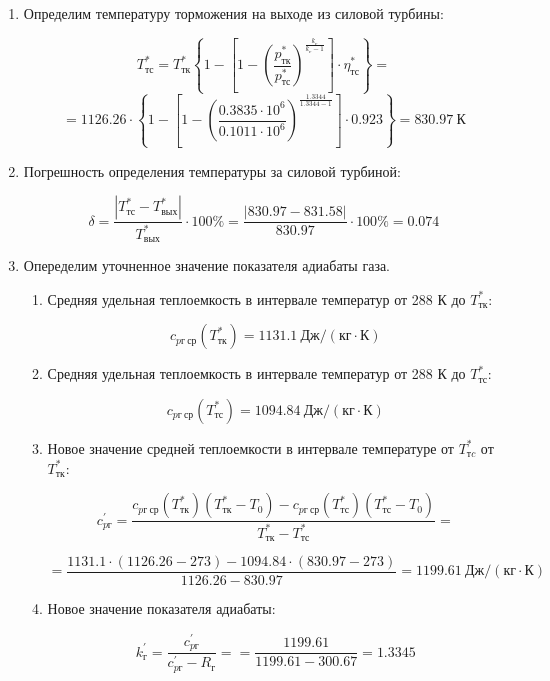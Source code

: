 \documentclass[a4paper,10pt]{article}
\begin{document}
\begin{enumerate}
	\item Определим температуру торможения на выходе из силовой турбины:
	
	\[
	T_{тс}^* = T_{тк}^* 
		\left\lbrace 
			1 - 
			\left[ 
				1 - 
					\left(
						\frac{ p_{тк}^* }{ p_{тс}^* }
					\right) ^ \frac{ k_г }{ k_г - 1 }
			\right] \cdot \eta_{тс}^*
		\right\rbrace = 
	\]
	\[
	= 1126.26 \cdot
		\left\lbrace 
			1 - 
			\left[ 
				1 - 
					\left(
						\frac{ 0.3835 \cdot 10^6 }{ 0.1011 \cdot 10^6 }
					\right) ^ \frac{ 1.3344 }{ 1.3344 - 1 }
			\right] \cdot 0.923
		\right\rbrace = 
	830.97\ К
	\]
	
	\item Погрешность определения температуры за силовой турбиной:
	
	\[
	\delta = \frac{ 
					\left| T_{тс}^* - T_{вых}^* \right|
				}{ 
					T_{вых}^*
				} \cdot 100 \%= 
		\frac{ 
			\left| 830.97 - 831.58 \right|
		}{ 
			830.97
		} \cdot 100 \% =
	0.074
	\]
	
	\item Опеределим уточненное значение показателя адиабаты газа.
	
	\begin{enumerate}
	
		\item Средняя удельная теплоемкость в интервале температур от 288 К до $ T_{тк}^* $:
		
		\[
		c_{pг\ ср} (T_{тк}^*) = 1131.1\ Дж / (кг \cdot К)
		\]
		
		\item Средняя удельная теплоемкость в интервале температур от 288 К до $ T_{тс}^* $:
		
		\[
		c_{pг\ ср} (T_{тс}^*) = 1094.84\ Дж / (кг \cdot К)
		\]
		
		\item Новое значение средней теплоемкости в интервале температуре от $ T_{тc}^* $ от $ T_{тк}^* $:
		
		\[
		c_{pг}^\prime = \frac{
			c_{pг\ ср}(T_{тк}^*) (T_{тк}^* - T_0) - c_{pг\ ср}(T_{тс}^*) (T_{тс}^* - T_0)
		}{
			T_{тк}^* - T_{тс}^*} = 
		\]
		
		\[ = \frac{
			1131.1 \cdot (1126.26 - 273) - 
			1094.84 \cdot (830.97 - 273)
		}{
			1126.26 - 830.97} = 
			1199.61 \ Дж / (кг \cdot К)
		\]
		
		\item Новое значение показателя адиабаты:
		
		\[
		k_{г}^\prime = \frac{ c_{pг}^\prime }{ c_{pг}^\prime - R_г } = 
				= \frac{ 1199.61 }{ 1199.61 - 300.67} =
				1.3345
		\]
		

\end{enumerate}
\end{enumerate}
\end{document}
